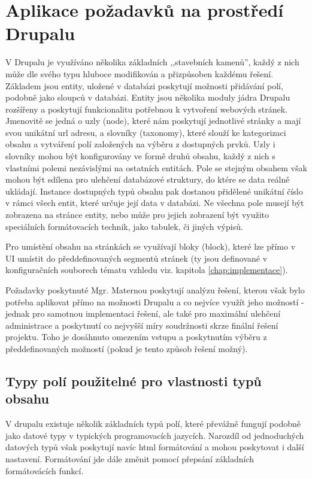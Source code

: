 \section{Aplikace požadavků na prostředí Drupalu}

V Drupalu je využíváno několika základních ,,stavebních kamenů'', každý z nich může dle svého typu hluboce modifikován a přizpůsoben každému řešení. Základem jsou entity, uložené v databázi poskytují možnosti přidávání polí, podobně jako sloupců v databázi. Entity jsou několika moduly jádra Drupalu rozšířeny a poskytují funkcionalitu potřebnou k vytvoření webových stránek. Jmenovitě se jedná o uzly (node), které nám poskytují jednotlivé stránky a mají svou unikátní url adresu, a slovníky (taxonomy), které slouží ke kategorizaci obsahu a vytváření polí založených na výběru z dostupných prvků. Uzly i slovníky mohou být konfigurovány ve formě druhů obsahu, každý z nich s vlastními polemi nezávislými na ostatních entitách. Pole se stejným obsahem však mohou být sdílena pro ulehčení databázové struktury, do ktére se data reálně ukládají. Instance dostupných typů obsahu pak dostanou přidělené unikátní číslo v rámci všech entit, které určuje její data v databázi. Ne všechna pole musejí být zobrazena na stránce entity, nebo může pro jejich zobrazení být využito speciálních formátovacích technik, jako tabulek, či jiných výpisů.

Pro umístění obsahu na stránkách se využívají bloky (block), které lze přímo v UI umístit do předdefinovaných segmentů stránek (ty jsou definované v konfiguračních souborech tématu vzhledu viz. kapitola \ref{chap:implementace}).

Požadavky \cite{omaterna2013} poskytnuté Mgr. Maternou poskytují analýzu řešení, kterou však bylo potřeba aplikovat přímo na možnosti Drupalu a co nejvíce využít jeho možností - jednak pro samotnou implementaci řešení, ale také pro maximální ulehčení administrace a poskytnutí co nejvyšší míry soudržnosti skrze finální řešení projektu. Toho je dosáhnuto omezením vstupu a poskytnutím výběru z předdefinovaných možností (pokud je tento způsob řešení možný).

\subsection{Typy polí použitelné pro vlastnosti typů obsahu}
V drupalu existuje několik základních typů polí, které převážně fungují podobně jako datové typy v typických programovacích jazycích. Narozdíl od jednoduchých datových typů však poskytují navíc html formátování a mohou poskytovat i další nastavení. Formátování jde dále změnit pomocí přepsání základních formátovácích funkcí.

